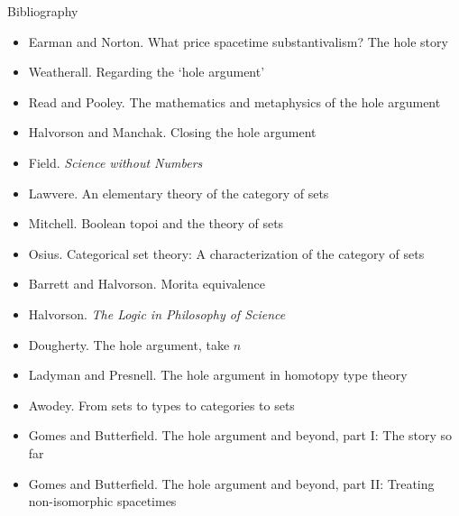 \documentclass{beamer}
\begin{document}
\begin{frame}{Bibliography}

\tiny 
\begin{itemize}
\item Earman and Norton. What price spacetime substantivalism? The
  hole story
\item Weatherall. Regarding the `hole argument'
\item Read and Pooley. The mathematics and metaphysics of the hole
  argument
\item Halvorson and Manchak. Closing the hole argument
\item Field. \emph{Science without Numbers}
\item Lawvere. An elementary theory of the category of sets
\item Mitchell. Boolean topoi and the theory of sets
\item Osius. Categorical set theory: A characterization of the
  category of sets
\item Barrett and Halvorson. Morita equivalence
\item Halvorson. \textit{The Logic in Philosophy of Science}
\item Dougherty. The hole argument, take $n$  
\item Ladyman and Presnell. The hole argument in homotopy type theory
\item Awodey. From sets to types to categories to sets
\item Gomes and Butterfield. The hole argument and beyond, part I: The
  story so far
\item Gomes and Butterfield. The hole argument and beyond, part II:
  Treating non-isomorphic spacetimes
\end{itemize}

    


\end{frame}
\end{document}
